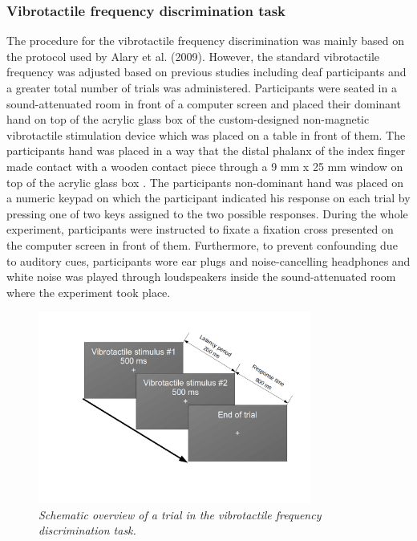 \documentclass[12pt]{article}
\begin{document}
\subsubsection{Vibrotactile frequency discrimination task}
The procedure for the vibrotactile frequency discrimination was mainly based on the protocol used by Alary et al. (2009). However, the standard vibrotactile frequency was adjusted based on previous studies including deaf participants \parencite{auer_vibrotactile_2007} and a greater total number of trials was administered. Participants were seated in a sound-attenuated room in front of a computer screen and placed their dominant hand on top of the acrylic glass box of the custom-designed non-magnetic vibrotactile stimulation device which was placed on a table in front of them. The participants hand was placed in a way that the distal phalanx of the index finger made contact with a wooden contact piece through a 9 mm x 25 mm  window on top of the acrylic glass box \parencite[see][]{alary_tactile_2009}. The participants non-dominant hand was placed on a numeric keypad on which the participant indicated his response on each trial by pressing one of two keys assigned to the two possible responses. During the whole experiment, participants were instructed to fixate a fixation cross presented on the computer screen in front of them. Furthermore, to prevent confounding due to auditory cues, participants wore ear plugs and noise-cancelling headphones and white noise was played through loudspeakers inside the sound-attenuated room where the experiment took place.
\begin{figure}[t!]
    \centering
    \includegraphics[width=0.8\textwidth]{VTFD_overview.png}
    \caption{\textit{\footnotesize{Schematic overview of a trial in the vibrotactile frequency discrimination task.}}}
    \label{fig:VTFD}
\end{figure}
\end{document}
